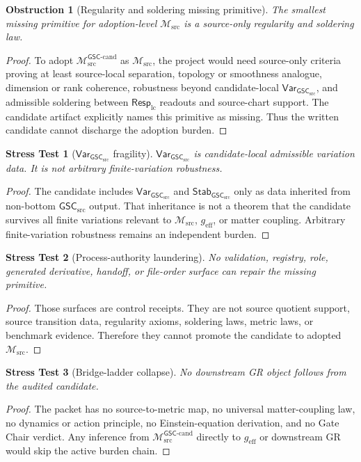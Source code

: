 \documentclass[11pt]{article}
\newcommand{\RespLC}{\mathsf{Resp}_{\mathrm{lc}}}
\newcommand{\Msrc}{\mathcal{M}_{\mathrm{src}}}
\newcommand{\Mgsccand}{\mathcal{M}_{\mathrm{src}}^{\mathsf{GSC}\text{-}\mathrm{cand}}}
\newcommand{\geff}{g_{\mathrm{eff}}}
\newcommand{\GSC}{\mathsf{GSC}_{\mathrm{src}}}
\newcommand{\Vargsc}{\mathsf{Var}_{\GSC}}
\newcommand{\Stabgsc}{\mathsf{Stab}_{\GSC}}
\newtheorem{stress}{Stress Test}
\newtheorem{obstruction}{Obstruction}
\begin{document}
\begin{obstruction}[Regularity and soldering missing primitive]
The smallest missing primitive for adoption-level \(\Msrc\) is a source-only
regularity and soldering law.
\end{obstruction}

\begin{proof}
To adopt \(\Mgsccand\) as \(\Msrc\), the project would need source-only
criteria proving at least source-local separation, topology or smoothness
analogue, dimension or rank coherence, robustness beyond candidate-local
\(\Vargsc\), and admissible soldering between \(\RespLC\) readouts and
source-chart support. The candidate artifact explicitly names this primitive
as missing. Thus the written candidate cannot discharge the adoption burden.
\end{proof}

\begin{stress}[\(\Vargsc\) fragility]
\(\Vargsc\) is candidate-local admissible variation data. It is not arbitrary
finite-variation robustness.
\end{stress}

\begin{proof}
The candidate includes \(\Vargsc\) and \(\Stabgsc\) only as data inherited
from non-bottom \(\GSC\) output. That inheritance is not a theorem that the
candidate survives all finite variations relevant to \(\Msrc\), \(\geff\), or
matter coupling. Arbitrary finite-variation robustness remains an independent
burden.
\end{proof}

\begin{stress}[Process-authority laundering]
No validation, registry, role, generated derivative, handoff, or file-order
surface can repair the missing primitive.
\end{stress}

\begin{proof}
Those surfaces are control receipts. They are not source quotient support,
source transition data, regularity axioms, soldering laws, metric laws, or
benchmark evidence. Therefore they cannot promote the candidate to adopted
\(\Msrc\).
\end{proof}

\begin{stress}[Bridge-ladder collapse]
No downstream GR object follows from the audited candidate.
\end{stress}

\begin{proof}
The packet has no source-to-metric map, no universal matter-coupling law, no
dynamics or action principle, no Einstein-equation derivation, and no Gate
Chair verdict. Any inference from \(\Mgsccand\) directly to \(\geff\) or
downstream GR would skip the active burden chain.
\end{proof}
\end{document}

